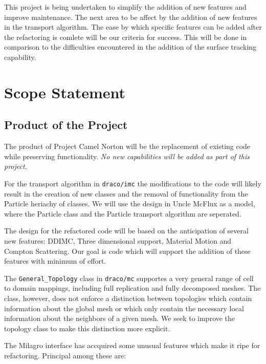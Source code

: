 \documentclass[11pt]{nmemo}
\begin{document}
This project is being undertaken to simplify the addition of new
features and improve maintenance. The next area to be affect by the
addition of new features in the transport algorithm. The ease by which
specific features can be added after the refactoring is comlete will
be our criteria for success. This will be done in comparison to the
difficulties encountered in the addition of the surface tracking
capability.

\newpage
\section*{Scope Statement}


\subsection*{Product of the Project}

The product of Project Camel Norton will be the replacement of
existing code while preserving functionality. {\em No new capabilities
  will be added as part of this project.}

For the transport algorithm in {\tt draco/imc} the modifications to
the code will likely result in the creation of new classes and the
removal of functionality from the Particle heriachy of classes. We
will use the design in Uncle McFlux as a model, where the Particle
class and the Particle transport algorithm are seperated.

The design for the refactored code will be based on the anticipation
of several new features: DDIMC, Three dimensional support, Material
Motion and Compton Scattering. Our goal is code which will support the
addition of these features with minimum of effort.

The {\tt General\_Topology} class in {\tt draco/mc} supportes a very
general range of cell to domain mappings, including full replication
and fully decomposed meshes. The class, however, does not enforce a
distinction between topologies which contain information about the
global mesh or which only contain the necessary local information
about the neighbors of a given mesh. We seek to improve the topology
class to make this distinction more explicit.

The Milagro interface has accquired some unusual features which make
it ripe for refactoring. Principal among these are:
\end{document}

